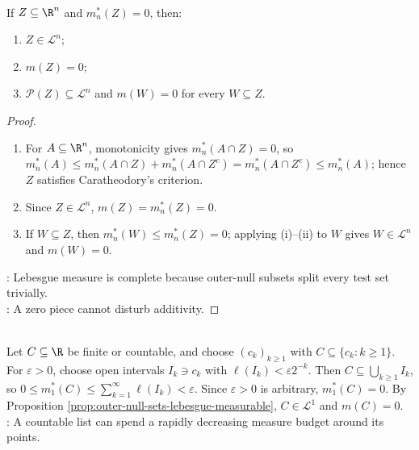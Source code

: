 \begin{proposition} \label{prop:outer-null-sets-lebesgue-measurable} \\
If $Z\subseteq\R^n$ and $m_n^\ast(Z)=0$, then:
\begin{enumerate}[label=(\roman*)]
\setlength{\itemsep}{0pt}
\item $Z\in\mathcal{L}^n$;
\item $m(Z)=0$;
\item $\mathcal{P}(Z)\subseteq\mathcal{L}^n$ and $m(W)=0$ for every $W\subseteq Z$.
\end{enumerate}
\begin{proof}
\begin{enumerate}[label=(\roman*)]
\setlength{\itemsep}{0pt}
\item For $A\subseteq\R^n$, monotonicity gives $m_n^\ast(A\cap Z)=0$, so $m_n^\ast(A)\leq m_n^\ast(A\cap Z)+m_n^\ast(A\cap Z^c)=m_n^\ast(A\cap Z^c)\leq m_n^\ast(A)$; hence $Z$ satisfies Caratheodory's criterion.
\item Since $Z\in\mathcal{L}^n$, $m(Z)=m_n^\ast(Z)=0$.
\item If $W\subseteq Z$, then $m_n^\ast(W)\leq m_n^\ast(Z)=0$; applying (i)--(ii) to $W$ gives $W\in\mathcal{L}^n$ and $m(W)=0$.
\end{enumerate}
: Lebesgue measure is complete because outer-null subsets split every test set trivially.\\
: A zero piece cannot disturb additivity.
\end{proof}
\end{proposition}

\begin{example} \label{ex:countable-real-sets-outer-null} \\
Let $C\subseteq\R$ be finite or countable, and choose $(c_k)_{k\geq1}$ with $C\subseteq\{c_k:k\geq1\}$. For $\varepsilon>0$, choose open intervals $I_k\ni c_k$ with $\ell(I_k)<\varepsilon2^{-k}$. Then $C\subseteq\bigcup_{k\geq1}I_k$, so $0\leq m_1^\ast(C)\leq\sum_{k=1}^{\infty}\ell(I_k)<\varepsilon$. Since $\varepsilon>0$ is arbitrary, $m_1^\ast(C)=0$. By Proposition \ref{prop:outer-null-sets-lebesgue-measurable}, $C\in\mathcal{L}^1$ and $m(C)=0$.\\
: A countable list can spend a rapidly decreasing measure budget around its points.
\end{example}

